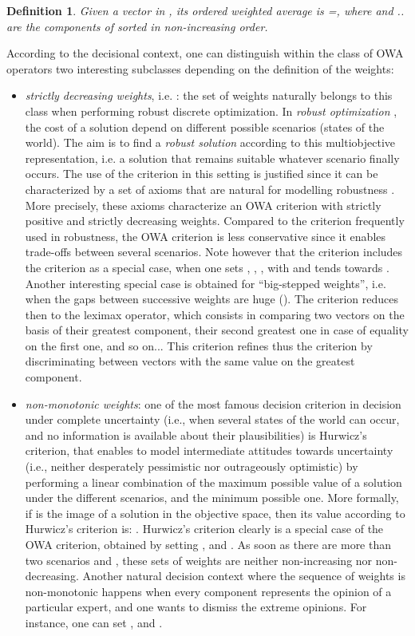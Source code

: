 \documentclass[final,3p,times]{elsarticle}
\newtheorem{defi}{Definition}
\begin{document}
\begin{defi}
Given a vector  in , its ordered weighted average is =, where  and   ..   are the components of  sorted in non-increasing order.
\end{defi}

According to the decisional context, one can distinguish within the class of OWA operators two interesting subclasses depending on the definition of the weights:
\begin{itemize}
\item \emph{strictly decreasing weights}, i.e. : the set of weights naturally belongs to this class when
  performing robust discrete optimization. In \emph{robust
    optimization} \cite{KouvY97}, the cost of a solution depend on
  different possible scenarios (states of the world). The aim is to
  find a \emph{robust solution} according to this multiobjective
  representation, i.e. a solution that remains suitable whatever
  scenario finally occurs. The use of the  criterion in this setting is justified since it can be characterized by a set of axioms that are natural for modelling robustness \cite{PernS03}. More precisely, these axioms characterize an OWA criterion with strictly positive and strictly decreasing weights. Compared to
  the  criterion frequently used in robustness, the OWA
  criterion is less conservative since it enables trade-offs between
  several scenarios. Note however that the  criterion includes
  the  criterion as a special case, when one sets
  , , ,
   with 
  and  tends towards . Another interesting special
  case is obtained for ``big-stepped weights'', i.e. when the gaps
  between successive weights are huge (). The
   criterion reduces then to the leximax operator, which
  consists in comparing two vectors on the basis of their greatest
  component, their second greatest one in case of equality on the
  first one, and so on... This criterion refines thus the 
  criterion by discriminating between vectors with the same value on
  the greatest component.
\item \emph{non-monotonic weights}: one of the most famous decision criterion in decision under complete uncertainty (i.e., when several states of the world can occur, and no information is available about their plausibilities) is Hurwicz's criterion, that enables to model intermediate attitudes towards uncertainty (i.e., neither desperately pessimistic nor outrageously optimistic) by performing a linear combination of the maximum possible value of a solution under the different scenarios, and the minimum possible one. More formally, if  is the image of a solution in the objective space, then its value according to Hurwicz's criterion is: . Hurwicz's criterion clearly is a special case of the OWA criterion, obtained by setting ,  and  . As soon as there are more than two scenarios and , these sets of weights are neither non-increasing nor non-decreasing. Another natural decision context where the sequence of weights is non-monotonic happens when every component represents the opinion of a particular expert, and one wants to dismiss the extreme opinions. For instance, one can set ,  and  .
\end{itemize}
\end{document}
